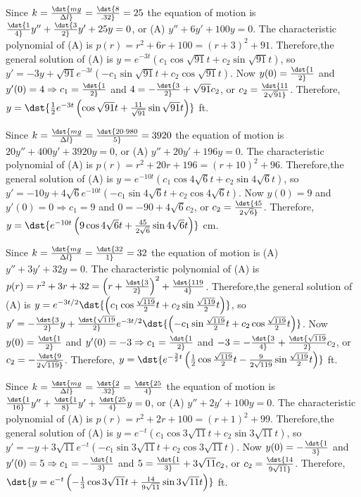 \documentclass[dvips]{book}
\renewcommand{\exer}[1]{\par\medskip\;\noindent{\color{red}\bf #1.}}
\numberwithin{example}{section}
\numberwithin{equation}{section}
\numberwithin{theorem}{section}
\numberwithin{table}{section}
\numberwithin{figure}{section}
\begin{document}
\exer{6.2.6}
Since $k=\dst{mg\over\Delta l}=\dst{8\over.32}=25$ the equation of
motion is $\dst{1\over4}y''+\dst{3\over2}y'+25y=0$, or (A)
$y''+6y'+100y=0$. The characteristic polynomial of (A) is
$p(r)=r^2+6r+100=(r+3)^2+91$. Therefore,the general solution of (A) is
$y=e^{-3t}(c_1\cos\sqrt{91}t+c_2\sin\sqrt{91}t)$, so
$y'=-3y+\sqrt{91}e^{-3t}(-c_1\sin\sqrt{91}t+c_2\cos\sqrt{91}t)$. Now
$y(0)=\dst{1\over2}$ and $y'(0)=4\Rightarrow c_1=\dst{1\over2}$ and
$4=-\dst{3\over2}+\sqrt{91}c_2$, or $c_2=\dst{11\over2\sqrt91}$.
Therefore,$y=\dst{{1\over2}e^{-3t}\left(\cos\sqrt{91}t+{11\over
\sqrt{91}}\sin\sqrt{91}t\right)}$ ft.


\exer{6.2.8}
Since $k=\dst{mg\over\Delta l}=\dst{20\cdot980\over5}=3920$ the
equation of motion is $20y''+400y'+3920y=0$, or (A) $y''+20y'+196y=0$.
The characteristic polynomial of (A) is
$p(r)=r^2+20r+196=(r+10)^2+96$. Therefore,the general solution of (A)
is $y=e^{-10t}(c_1\cos4\sqrt6t+c_2\sin4\sqrt6t)$, so
$y'=-10y+4\sqrt6e^{-10t}(-c_1\sin4\sqrt6t+c_2\cos4\sqrt6t)$. Now
$y(0)=9$ and $y'(0)=0\Rightarrow c_1=9$ and $0=-90+4\sqrt6c_2$, or
$c_2=\dst{45\over2\sqrt6}$. Therefore,
$y=\dst{e^{-10t}\left(9\cos4\sqrt{6}t+{45\over2\sqrt{6}}\sin4\sqrt{6}
t\right)}$ cm.


\exer{6.2.10}
Since $k=\dst{mg\over\Delta l}=\dst{32\over1}=32$ the equation of
motion is (A) $y''+3y'+32y=0$. The characteristic polynomial of (A) is
$p(r)=r^2+3r+32=\left(r+\dst{3\over2}\right)^2+\dst{119\over4}$.
Therefore,the general solution of (A) is
$y=e^{-3t/2}\dst{\left(c_1\cos{\sqrt{119}\over2}t
+c_2\sin{\sqrt{119}\over2}t\right)}$, so $y'=-\dst{3\over2}y+
\dst{\sqrt{119}\over2}e^{-3t/2}
\dst{\left(-c_1\sin{\sqrt{119}\over2}t+c_2\cos{\sqrt{119}\over2}t\right)}$.
Now $y(0)=\dst{1\over2}$ and $y'(0)=-3\Rightarrow c_1=\dst{1\over2}$
and $-3=-\dst{3\over4}+\dst{\sqrt{119}\over2}c_2$, or
$c_2=-\dst{9\over2\sqrt{119}}$. Therefore,
$y=\dst{e^{-{3\over2}t}\left({1\over2}\cos {\sqrt{119}\over2} t
-{9\over2\sqrt{119}}\sin{\sqrt{119}\over2}t\right)}$ ft.


\exer{6.2.12}
Since $k=\dst{mg\over\Delta l}=\dst{2\over.32}=\dst{25\over4}$ the
equation of motion is
$\dst{1\over16}y''+\dst{1\over8}y'+\dst{25\over4}y=0$, or (A)
$y''+2y'+100y=0$. The characteristic polynomial of (A) is
$p(r)=r^2+2r+100=(r+1)^2+99$. Therefore,the general solution of (A) is
$y=e^{-t}(c_1\cos3\sqrt{11}t+c_2\sin3\sqrt{11}t)$, so
$y'=-y+3\sqrt{11}e^{-t}(-c_1\sin3\sqrt{11}t+c_2\cos3\sqrt{11}t)$. Now
$y(0)=-\dst{1\over3}$ and $y'(0)=5\Rightarrow c_1=-\dst{1\over3}$ and
$5=\dst{1\over3}+3\sqrt{11}c_2$, or $c_2=\dst{14\over9\sqrt{11}}$.
Therefore,$\dst{y=e^{-t}\left(-{1\over3}\cos3\sqrt{11} t+
{14\over9\sqrt{11}}\sin3\sqrt{11}t\right)}$ ft.
\end{document}

